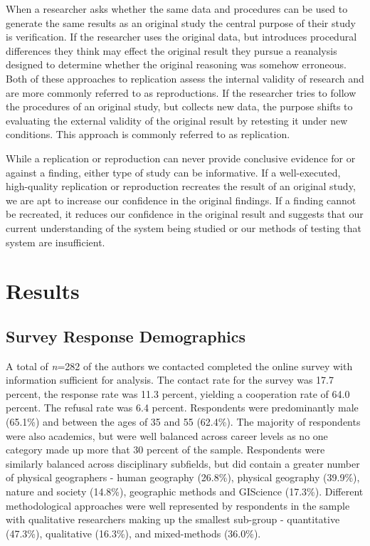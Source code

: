 \documentclass[]{interact}
\theoremstyle{plain}%
\theoremstyle{definition}
\theoremstyle{remark}
\begin{document}
When a researcher asks whether the same data and procedures can be used to generate the same results as an original study the central purpose of their study is verification.
If the researcher uses the original data, but introduces procedural differences they think may effect the original result they pursue a reanalysis designed to determine whether the original reasoning was somehow erroneous. 
Both of these approaches to replication assess the internal validity of research and are more commonly referred to as reproductions.
If the researcher tries to follow the procedures of an original study, but collects new data, the purpose shifts to evaluating the external validity of the original result by retesting it under new conditions.
This approach is commonly referred to as replication. 

While a replication or reproduction can never provide conclusive evidence for or against a finding, either type of study can be informative. 
If a well-executed, high-quality replication or reproduction recreates the result of an original study, we are apt to increase our confidence in the original findings. 
If a finding cannot be recreated, it reduces our confidence in the original result and suggests that our current understanding of the system being studied or our methods of testing that system are insufficient.

\section*{Results}

\subsection*{Survey Response Demographics}
A total of \textit{n}=282 of the authors we contacted completed the online survey with information sufficient for analysis. 
The contact rate for the survey was 17.7 percent, the response rate was 11.3 percent, yielding a cooperation rate of 64.0 percent. 
The refusal rate was 6.4 percent.
Respondents were predominantly male (65.1\%) and between the ages of 35 and 55 (62.4\%). 
The majority of respondents were also academics, but were well balanced across career levels as no one category made up more that 30 percent of the sample.
Respondents were similarly balanced across disciplinary subfields, but did contain a greater number of physical geographers  - human geography (26.8\%), physical geography (39.9\%), nature and society (14.8\%), geographic methods and GIScience (17.3\%). 
Different methodological approaches were well represented by respondents in the sample with qualitative researchers making up the smallest sub-group  - quantitative (47.3\%), qualitative (16.3\%), and mixed-methods (36.0\%).
\end{document}
